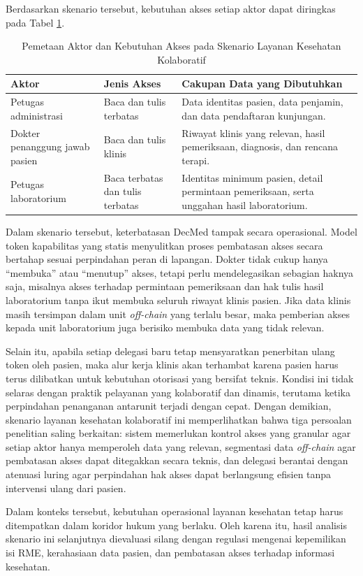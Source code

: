 Berdasarkan skenario tersebut, kebutuhan akses setiap aktor dapat diringkas pada Tabel \ref{tab:skenario-layanan-kolaboratif}.

\begin{table}[!ht]
	\centering
	\caption{Pemetaan Aktor dan Kebutuhan Akses pada Skenario Layanan Kesehatan Kolaboratif}
	\label{tab:skenario-layanan-kolaboratif}
	\small
	\begin{tabular}{|p{}|p{}|p{}|}
		\hline
		\textbf{Aktor} & \textbf{Jenis Akses} & \textbf{Cakupan Data yang Dibutuhkan} \\ \hline
		Petugas administrasi & Baca dan tulis terbatas & Data identitas pasien, data penjamin, dan data pendaftaran kunjungan. \\ \hline
		Dokter penanggung jawab pasien & Baca dan tulis klinis & Riwayat klinis yang relevan, hasil pemeriksaan, diagnosis, dan rencana terapi. \\ \hline
		Petugas laboratorium & Baca terbatas dan tulis terbatas & Identitas minimum pasien, detail permintaan pemeriksaan, serta unggahan hasil laboratorium. \\ \hline
	\end{tabular}
\end{table}

Dalam skenario tersebut, keterbatasan DecMed tampak secara operasional. Model token kapabilitas yang statis menyulitkan proses pembatasan akses secara bertahap sesuai perpindahan peran di lapangan. Dokter tidak cukup hanya ``membuka'' atau ``menutup'' akses, tetapi perlu mendelegasikan sebagian haknya saja, misalnya akses terhadap permintaan pemeriksaan dan hak tulis hasil laboratorium tanpa ikut membuka seluruh riwayat klinis pasien. Jika data klinis masih tersimpan dalam unit \textit{off-chain} yang terlalu besar, maka pemberian akses kepada unit laboratorium juga berisiko membuka data yang tidak relevan.

Selain itu, apabila setiap delegasi baru tetap mensyaratkan penerbitan ulang token oleh pasien, maka alur kerja klinis akan terhambat karena pasien harus terus dilibatkan untuk kebutuhan otorisasi yang bersifat teknis. Kondisi ini tidak selaras dengan praktik pelayanan yang kolaboratif dan dinamis, terutama ketika perpindahan penanganan antarunit terjadi dengan cepat. Dengan demikian, skenario layanan kesehatan kolaboratif ini memperlihatkan bahwa tiga persoalan penelitian saling berkaitan: sistem memerlukan kontrol akses yang granular agar setiap aktor hanya memperoleh data yang relevan, segmentasi data \textit{off-chain} agar pembatasan akses dapat ditegakkan secara teknis, dan delegasi berantai dengan atenuasi luring agar perpindahan hak akses dapat berlangsung efisien tanpa intervensi ulang dari pasien.

Dalam konteks tersebut, kebutuhan operasional layanan kesehatan tetap harus ditempatkan dalam koridor hukum yang berlaku. Oleh karena itu, hasil analisis skenario ini selanjutnya dievaluasi silang dengan regulasi mengenai kepemilikan isi RME, kerahasiaan data pasien, dan pembatasan akses terhadap informasi kesehatan.
